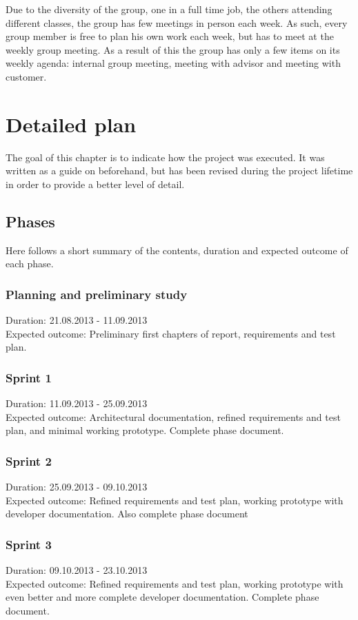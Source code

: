 \documentclass[11pt]{book}
\begin{document}
Due to the diversity of the group, one in a full time job, the others attending different classes, the group has few meetings in person each week. As such, every group member is free to plan his own work each week, but has to meet at the weekly group meeting. As a result of this the group has only a few items on its weekly agenda: internal group meeting, meeting with advisor and meeting with customer.

\section{Detailed plan}
The goal of this chapter is to indicate how the project was executed. It was written as a guide on beforehand, but has been revised during the project lifetime in order to provide a better level of detail.

\subsection{Phases}
Here follows a short summary of the contents, duration and expected outcome of each phase.

\subsubsection{Planning and preliminary study}
Duration: 21.08.2013 - 11.09.2013\\
Expected outcome: Preliminary first chapters of report, requirements and test plan.

\subsubsection{Sprint 1}
Duration: 11.09.2013 - 25.09.2013\\
Expected outcome: Architectural documentation, refined requirements and test plan, and minimal working prototype. Complete phase document.

\subsubsection{Sprint 2}
Duration: 25.09.2013 - 09.10.2013\\
Expected outcome: Refined requirements and test plan, working prototype with developer documentation. Also complete phase document

\subsubsection{Sprint 3}
Duration: 09.10.2013 - 23.10.2013\\
Expected outcome: Refined requirements and test plan, working prototype with even better and more complete developer documentation. Complete phase document.
\end{document}
